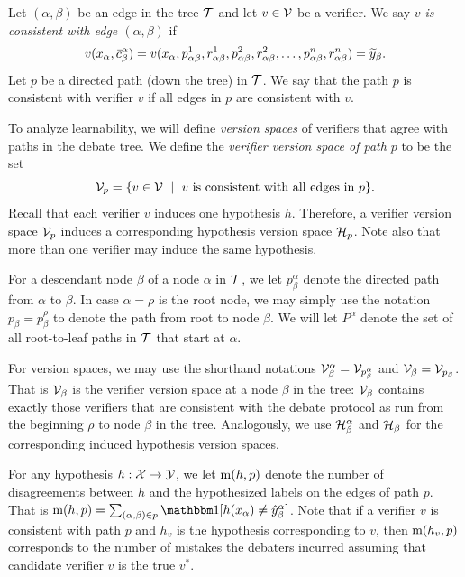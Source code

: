 \documentclass[anon]{alt2027} %
\begin{document}
Let $(\alpha,\beta)$ be an edge in the tree ${\mathcal T}$ and let $v\in{\mathcal V}$ be a verifier. We say \emph{$v$ is consistent with edge $(\alpha, \beta)$} if
\[
v(x_\alpha, \bar{c}^\alpha_\beta) = v(x_\alpha, {p}^1_{\alpha\beta}, {r}^1_{\alpha\beta}, {p}^2_{\alpha\beta}, {r}^2_{\alpha\beta}, \ldots,  {p}^n_{\alpha\beta}, {r}^n_{\alpha\beta}) = {\widetilde{y}}_\beta.
\]
Let $p$ be a directed path (down the tree) in ${\mathcal T}$. We say that the path $p$ is consistent with verifier $v$ if all edges in $p$ are consistent with $v$.

To analyze learnability, we will define \emph{version spaces} of verifiers that agree with paths in the debate tree.
 We define the \emph{verifier version space of path $p$} to be the set
\[
 {\mathcal V}_p = \{ v\in{\mathcal V} ~\mid~ v \text{ is consistent with all edges in }p\}.
\]
Recall that each verifier $v$ induces one hypothesis $h$. Therefore, a verifier version space ${\mathcal V}_p$ induces a corresponding hypothesis version space ${{\mathcal H}}_p$. Note also that more than one verifier may induce the same hypothesis.

For a descendant node $\beta$ of a node $\alpha$ in ${\mathcal T}$, we let $p^\alpha_\beta$ denote the directed path from $\alpha$ to $\beta$.  In case $\alpha =\rho$ is the root node, we may simply use the notation $p_\beta = p^\rho_\beta$ to denote the path from root to node $\beta$. We will let $P^\alpha$ denote the set of all root-to-leaf paths in ${\mathcal T}$ that start at $\alpha$.

For version spaces, we may use the shorthand notations ${\mathcal V}^\alpha_\beta = {\mathcal V}_{p^\alpha_\beta}$ and ${\mathcal V}_\beta = {\mathcal V}_{p_\beta}$. That is ${\mathcal V}_\beta$ is the verifier version space at a node $\beta$ in the tree: ${\mathcal V}_\beta$ contains exactly those verifiers that are consistent with the debate protocol as run from the beginning $\rho$ to node $\beta$ in the tree. Analogously, we use ${{\mathcal H}}^\alpha_\beta$ and ${{\mathcal H}}_\beta$ for the corresponding induced hypothesis version spaces.

For any hypothesis $h:{\mathcal X}\to{\mathcal Y}$, we let $\mathrm{m}(h, p )$ denote the number of disagreements between $h$ and the hypothesized labels on the edges of path $p$. That is $\mi(h, p) = \sum_{(\alpha, \beta)\in p}\indct[h(x_\alpha)\neq \hy^\alpha_\beta]$.
Note that if a verifier $v$ is consistent with path $p$ and $h_v$ is the hypothesis corresponding to $v$, then  $\mathrm{m}(h_v, p)$ corresponds to the number of mistakes the debaters incurred assuming that candidate verifier $v$ is the true $v^*$.

\end{document}
